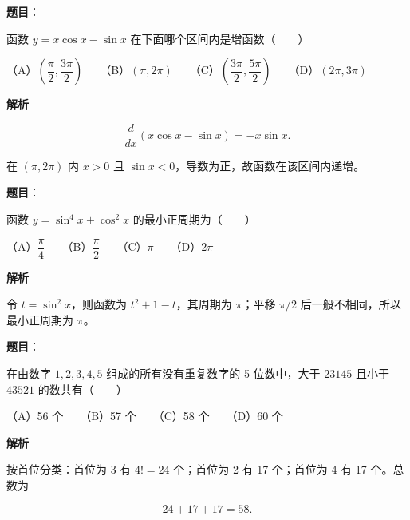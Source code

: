 \begin{answer}

\textbf{题目}：

函数 $y=x\cos x-\sin x$ 在下面哪个区间内是增函数\mbox{（　　）}

（A）$\left(\dfrac\pi2,\dfrac{3\pi}2\right)$　　（B）$(\pi,2\pi)$　　（C）$\left(\dfrac{3\pi}2,\dfrac{5\pi}2\right)$　　（D）$(2\pi,3\pi)$

\textbf{解析}

\nopagebreak[4]
\[
\frac{d}{dx}(x\cos x-\sin x)=-x\sin x.
\]

在 $(\pi,2\pi)$ 内 $x>0$ 且 $\sin x<0$，导数为正，故函数在该区间内递增。


\end{answer}
\begin{answer}

\textbf{题目}：

函数 $y=\sin^4x+\cos^2x$ 的最小正周期为\mbox{（　　）}

（A）$\dfrac\pi4$　　（B）$\dfrac\pi2$　　（C）$\pi$　　（D）$2\pi$

\textbf{解析}

令 $t=\sin^2x$，则函数为 $t^2+1-t$，其周期为 $\pi$；平移 $\pi/2$ 后一般不相同，所以最小正周期为 $\pi$。


\end{answer}
\begin{answer}

\textbf{题目}：

在由数字 $1,2,3,4,5$ 组成的所有没有重复数字的 5 位数中，大于 $23145$ 且小于 $43521$ 的数共有\mbox{（　　）}

（A）56 个　　（B）57 个　　（C）58 个　　（D）60 个

\textbf{解析}

按首位分类：首位为 3 有 $4!=24$ 个；首位为 2 有 17 个；首位为 4 有 17 个。总数为

\nopagebreak[4]
\[
24+17+17=58.
\]


\end{answer}
